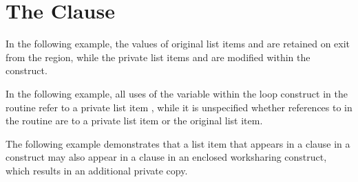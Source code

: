 \pagebreak
\chapter{The  Clause}
\label{chap:private}

In the following example, the values of original list items  and  
are retained on exit from the  region, while the private list 
items  and  are modified within the  construct. 



In the following example, all uses of the variable  within the loop construct 
in the routine  refer to a private list item , while it is 
unspecified whether references to  in the routine  are to a 
private list item or the original list item.



The following example demonstrates that a list item that appears in a  
 clause in a  construct may also appear in a  
 clause in an enclosed worksharing construct, which results in an additional private 
copy.




